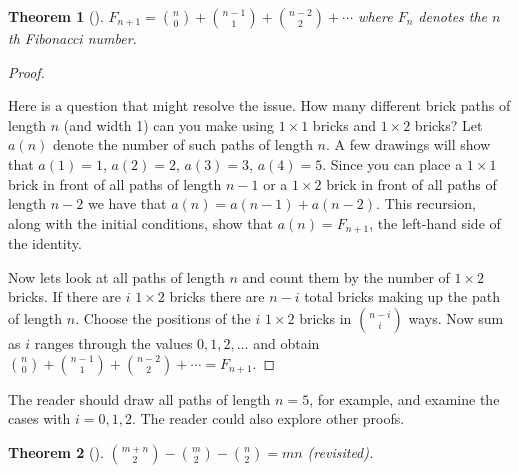 \documentclass[10pt,]{book}
\theoremstyle{plain}
\newtheorem{theorem}{Theorem}[section]
\theoremstyle{definition}
\theoremstyle{definition}
\numberwithin{equation}{chapter}
\begin{document}
\begin{theorem}[{}]\label{theorem-23}
\hypertarget{p-328}{}%
\(F_{n + 1} = \binom{n}{0} + \binom{n - 1}{1} + \binom{n - 2}{2} + \cdots\) where \(F_{n}\) denotes the \(n\)th Fibonacci number.%
\end{theorem}
\begin{proof}\hypertarget{proof-21}{}
\hypertarget{p-329}{}%
Here is a question that might resolve the issue. How many different brick paths of length \(n\) (and width 1) can you make using \(1\times 1\) bricks and \(1 \times 2\) bricks? Let \(a(n)\) denote the number of such paths of length \(n\). A few drawings will show that \(a(1)=1\), \(a(2)=2\), \(a(3)=3\), \(a(4)=5\). Since you can place a \(1\times 1\) brick in front of all paths of length \(n - 1\) or a \(1\times 2\) brick in front of all paths of length \(n - 2\) we have that \(a(n) = a(n - 1) + a(n - 2)\). This recursion, along with the initial conditions, show that \(a(n) = F_{n + 1}\), the left-hand side of the identity.%
\par
\hypertarget{p-330}{}%
Now lets look at all paths of length \(n\) and count them by the number of \(1\times 2\) bricks. If there are \(i\) \(1\times 2\) bricks there are \(n - i\) total bricks making up the path of length \(n\). Choose the positions of the \(i\) \(1\times 2\) bricks in \(\binom{n - i}{i}\) ways. Now sum as \(i\) ranges through the values \(0, 1, 2, \ldots\) and obtain \(\binom{n}{0} + \binom{n - 1}{1} + \binom{n - 2}{2} + \cdots = F_{n + 1}\).%
\end{proof}
\hypertarget{p-331}{}%
The reader should draw all paths of length \(n = 5\), for example, and examine the cases with \(i=0, 1, 2\). The reader could also explore other proofs.%
\begin{theorem}[{}]\label{theorem-24}
\hypertarget{p-332}{}%
\(\binom{m + n}{2} - \binom{m}{2} - \binom{n}{2} = mn\) (revisited).%
\end{theorem}
\end{document}
